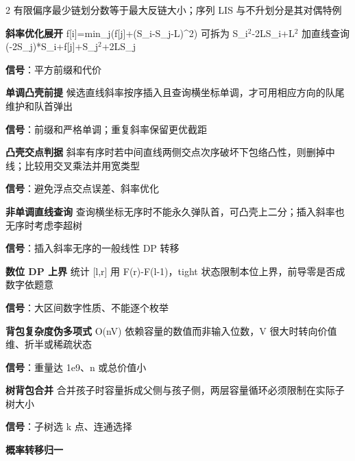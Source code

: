 \documentclass[UTF8,fontset=fandol,a4paper,twoside]{ctexart}
\begin{document}
\begin{multicols}{2}
有限偏序最少链划分数等于最大反链大小；序列 LIS 与不升划分是其对偶特例\par
\par\textbf{斜率优化展开}\quad
f[\allowbreak{}i]\allowbreak{}=\allowbreak{}min\_j(\allowbreak{}f[\allowbreak{}j]\allowbreak{}+\allowbreak{}(\allowbreak{}S\_i-\allowbreak{}S\_j-\allowbreak{}L)\allowbreak{}\textasciicircum{}2)\allowbreak{} 可拆为 S\_i\ensuremath{^2}-\allowbreak{}2LS\_i+\allowbreak{}L\ensuremath{^2} 加直线查询 (\allowbreak{}-\allowbreak{}2S\_j)\allowbreak{}*S\_i+\allowbreak{}f[\allowbreak{}j]\allowbreak{}+\allowbreak{}S\_j\ensuremath{^2}+\allowbreak{}2LS\_j\par
\textbf{信号}：平方前缀和代价\par
\par\textbf{单调凸壳前提}\quad
候选直线斜率按序插入且查询横坐标单调，才可用相应方向的队尾维护和队首弹出\par
\textbf{信号}：前缀和严格单调；重复斜率保留更优截距\par
\par\textbf{凸壳交点判据}\quad
斜率有序时若中间直线两侧交点次序破坏下包络凸性，则删掉中线；比较用交叉乘法并用宽类型\par
\textbf{信号}：避免浮点交点误差、斜率优化\par
\par\textbf{非单调直线查询}\quad
查询横坐标无序时不能永久弹队首，可凸壳上二分；插入斜率也无序时考虑李超树\par
\textbf{信号}：插入斜率无序的一般线性 DP 转移\par
\par\textbf{数位 DP 上界}\quad
统计 [\allowbreak{}l,\allowbreak{}r]\allowbreak{} 用 F(\allowbreak{}r)\allowbreak{}-\allowbreak{}F(\allowbreak{}l-\allowbreak{}1)\allowbreak{}，tight 状态限制本位上界，前导零是否成数字依题意\par
\textbf{信号}：大区间数字性质、不能逐个枚举\par
\par\textbf{背包复杂度伪多项式}\quad
O(\allowbreak{}nV)\allowbreak{} 依赖容量的数值而非输入位数，V 很大时转向价值维、折半或稀疏状态\par
\textbf{信号}：重量达 1e9、n 或总价值小\par
\par\textbf{树背包合并}\quad
合并孩子时容量拆成父侧与孩子侧，两层容量循环必须限制在实际子树大小\par
\textbf{信号}：子树选 k 点、连通选择\par
\par\textbf{概率转移归一}\quad

\end{multicols}
\end{document}
